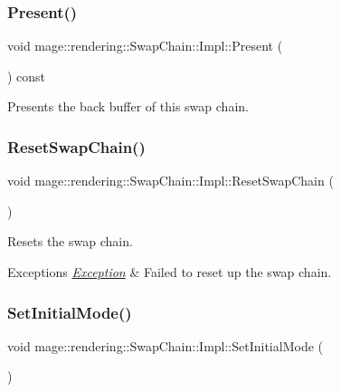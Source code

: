 \subsubsection{\texorpdfstring{Present()}{Present()}}
{\footnotesize\ttfamily void mage\+::rendering\+::\+Swap\+Chain\+::\+Impl\+::\+Present (\begin{DoxyParamCaption}{ }\end{DoxyParamCaption}) const\hspace{0.3cm}{\ttfamily [noexcept]}}

Presents the back buffer of this swap chain. \mbox{\label{classmage_1_1rendering_1_1_swap_chain_1_1_impl_afbc1208702d9807bed1126caae22bda6}} 
\subsubsection{\texorpdfstring{Reset\+Swap\+Chain()}{ResetSwapChain()}}
{\footnotesize\ttfamily void mage\+::rendering\+::\+Swap\+Chain\+::\+Impl\+::\+Reset\+Swap\+Chain (\begin{DoxyParamCaption}{ }\end{DoxyParamCaption})\hspace{0.3cm}{\ttfamily [private]}}

Resets the swap chain.


\begin{DoxyExceptions}{Exceptions}
{\em \mbox{\hyperlink{classmage_1_1_exception}{Exception}}} & Failed to reset up the swap chain. \\
\hline
\end{DoxyExceptions}
\mbox{\label{classmage_1_1rendering_1_1_swap_chain_1_1_impl_a910fab71dd7977005e11179080b25f14}} 
\subsubsection{\texorpdfstring{Set\+Initial\+Mode()}{SetInitialMode()}}
{\footnotesize\ttfamily void mage\+::rendering\+::\+Swap\+Chain\+::\+Impl\+::\+Set\+Initial\+Mode (\begin{DoxyParamCaption}{ }\end{DoxyParamCaption})}

